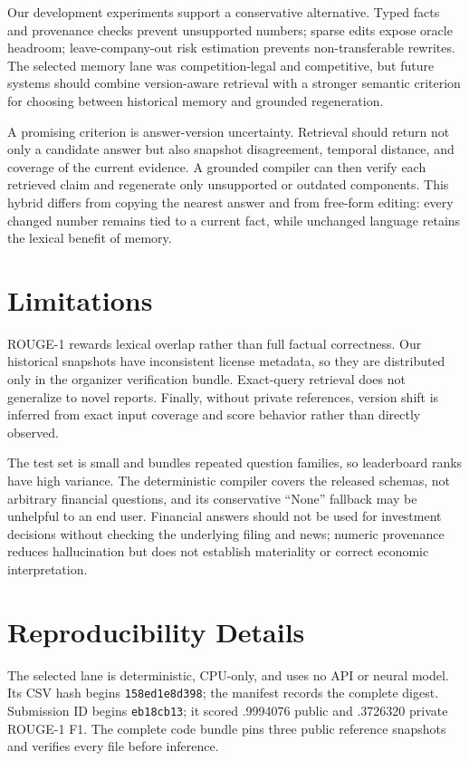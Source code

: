 \documentclass[11pt]{article}
\begin{document}
Our development experiments support a conservative alternative. Typed facts and provenance checks prevent unsupported numbers; sparse edits expose oracle headroom; leave-company-out risk estimation prevents non-transferable rewrites. The selected memory lane was competition-legal and competitive, but future systems should combine version-aware retrieval with a stronger semantic criterion for choosing between historical memory and grounded regeneration.

A promising criterion is answer-version uncertainty.  Retrieval should return
not only a candidate answer but also snapshot disagreement, temporal distance,
and coverage of the current evidence.  A grounded compiler can then verify each
retrieved claim and regenerate only unsupported or outdated components.  This
hybrid differs from copying the nearest answer and from free-form editing: every
changed number remains tied to a current fact, while unchanged language retains
the lexical benefit of memory.

\section*{Limitations}
ROUGE-1 rewards lexical overlap rather than full factual correctness. Our historical snapshots have inconsistent license metadata, so they are distributed only in the organizer verification bundle. Exact-query retrieval does not generalize to novel reports. Finally, without private references, version shift is inferred from exact input coverage and score behavior rather than directly observed.

The test set is small and bundles repeated question families, so leaderboard
ranks have high variance.  The deterministic compiler covers the released
schemas, not arbitrary financial questions, and its conservative ``None''
fallback may be unhelpful to an end user.  Financial answers should not be used
for investment decisions without checking the underlying filing and news;
numeric provenance reduces hallucination but does not establish materiality or
correct economic interpretation.

\clearpage


\appendix
\section{Reproducibility Details}
The selected lane is deterministic, CPU-only, and uses no API or neural model. Its CSV hash begins \texttt{158ed1e8d398}; the manifest records the complete digest. Submission ID begins \texttt{eb18cb13}; it scored .9994076 public and .3726320 private ROUGE-1 F1. The complete code bundle pins three public reference snapshots and verifies every file before inference.
\end{document}
